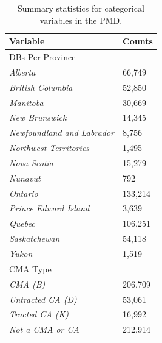 \documentclass[11pt, a4paper]{article}
\begin{document}
\begin{table}[H]
\centering
\caption[Summary of categorical variables]{Summary statistics for categorical variables in the PMD.}\label{categorical}
\begin{tabular}{|l|l|}
\hline
\textbf{Variable}  & \textbf{Counts}  \\
\hline
{DBs Per Province} &  \\
\hspace{2pc} \textit{Alberta} & 66,749 \\
\hspace{2pc} \textit{British Columbia} & 52,850 \\
\hspace{2pc} \textit{Manitoba} & 30,669 \\
\hspace{2pc} \textit{New Brunswick} & 14,345 \\
\hspace{2pc} \textit{Newfoundland and Labrador} & 8,756 \\
\hspace{2pc} \textit{Northwest Territories} & 1,495 \\
\hspace{2pc} \textit{Nova Scotia} & 15,279 \\
\hspace{2pc} \textit{Nunavut} & 792 \\
\hspace{2pc} \textit{Ontario} & 133,214 \\
\hspace{2pc} \textit{Prince Edward Island} & 3,639 \\
\hspace{2pc} \textit{Quebec} &  106,251 \\
\hspace{2pc} \textit{Saskatchewan} & 54,118 \\
\hspace{2pc} \textit{Yukon} & 1,519 \\
\hline

{CMA Type} &  \\
\hspace{2pc} \textit{CMA (B)} & 206,709 \\
\hspace{2pc} \textit{Untracted CA (D)} & 53,061 \\
\hspace{2pc} \textit{Tracted CA (K)} & 16,992 \\
\hspace{2pc} \textit{Not a CMA or CA} & 212,914 \\
\hline


\end{tabular}
\end{table}
\end{document}
